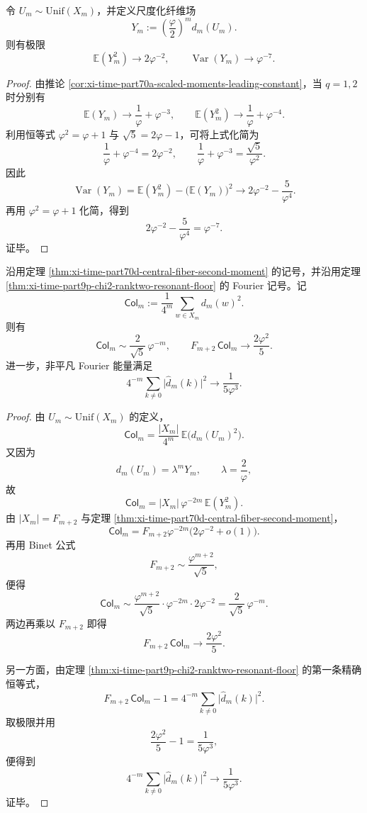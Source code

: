 \begin{theorem}[中心纤维场的精确二阶常数]\label{thm:xi-time-part70d-central-fiber-second-moment}
令 \(U_m\sim \mathrm{Unif}(X_m)\)，并定义尺度化纤维场
\[
Y_m:=\left(\frac{\varphi}{2}\right)^m d_m(U_m).
\]
则有极限
\[
\mathbb E(Y_m^2)\longrightarrow 2\varphi^{-2},
\qquad
\operatorname{Var}(Y_m)\longrightarrow \varphi^{-7}.
\]
\end{theorem}
\begin{proof}
由推论 \ref{cor:xi-time-part70a-scaled-moments-leading-constant}，当 \(q=1,2\) 时分别有
\[
\mathbb E(Y_m)
\longrightarrow
\frac{1}{\varphi}+\varphi^{-3},
\qquad
\mathbb E(Y_m^2)
\longrightarrow
\frac{1}{\varphi}+\varphi^{-4}.
\]
利用恒等式 \(\varphi^2=\varphi+1\) 与 \(\sqrt5=2\varphi-1\)，可将上式化简为
\[
\frac{1}{\varphi}+\varphi^{-4}=2\varphi^{-2},
\qquad
\frac{1}{\varphi}+\varphi^{-3}=\frac{\sqrt5}{\varphi^2}.
\]
因此
\[
\operatorname{Var}(Y_m)
=
\mathbb E(Y_m^2)-\bigl(\mathbb E(Y_m)\bigr)^2
\longrightarrow
2\varphi^{-2}-\frac{5}{\varphi^4}.
\]
再用 \(\varphi^2=\varphi+1\) 化简，得到
\[
2\varphi^{-2}-\frac{5}{\varphi^4}=\varphi^{-7}.
\]
证毕。
\end{proof}

\begin{theorem}\label{thm:xi-time-part70d-collision-riesz-main-terms}
沿用定理 \ref{thm:xi-time-part70d-central-fiber-second-moment} 的记号，并沿用定理 \ref{thm:xi-time-part9p-chi2-ranktwo-resonant-floor} 的 Fourier 记号。记
\[
\mathsf{Col}_m:=
\frac{1}{4^m}\sum_{w\in X_m}d_m(w)^2.
\]
则有
\[
\mathsf{Col}_m\sim \frac{2}{\sqrt5}\,\varphi^{-m},
\qquad
F_{m+2}\,\mathsf{Col}_m\longrightarrow \frac{2\varphi^2}{5}.
\]
进一步，非平凡 Fourier 能量满足
\[
4^{-m}\sum_{k\ne 0}\bigl|\widehat d_m(k)\bigr|^2
\longrightarrow
\frac{1}{5\varphi^3}.
\]
\end{theorem}
\begin{proof}
由 \(U_m\sim\mathrm{Unif}(X_m)\) 的定义，
\[
\mathsf{Col}_m
=
\frac{|X_m|}{4^m}\,\mathbb E\!\bigl(d_m(U_m)^2\bigr).
\]
又因为
\[
d_m(U_m)=\lambda^m Y_m,
\qquad
\lambda=\frac{2}{\varphi},
\]
故
\[
\mathsf{Col}_m
=
|X_m|\,\varphi^{-2m}\,\mathbb E(Y_m^2).
\]
由 \(|X_m|=F_{m+2}\) 与定理 \ref{thm:xi-time-part70d-central-fiber-second-moment}，
\[
\mathsf{Col}_m
=
F_{m+2}\varphi^{-2m}\bigl(2\varphi^{-2}+o(1)\bigr).
\]
再用 Binet 公式
\[
F_{m+2}\sim \frac{\varphi^{m+2}}{\sqrt5},
\]
便得
\[
\mathsf{Col}_m
\sim
\frac{\varphi^{m+2}}{\sqrt5}\cdot \varphi^{-2m}\cdot 2\varphi^{-2}
=
\frac{2}{\sqrt5}\,\varphi^{-m}.
\]
两边再乘以 \(F_{m+2}\) 即得
\[
F_{m+2}\,\mathsf{Col}_m\longrightarrow \frac{2\varphi^2}{5}.
\]

另一方面，由定理 \ref{thm:xi-time-part9p-chi2-ranktwo-resonant-floor} 的第一条精确恒等式，
\[
F_{m+2}\,\mathsf{Col}_m-1
=
4^{-m}\sum_{k\ne 0}\bigl|\widehat d_m(k)\bigr|^2.
\]
取极限并用
\[
\frac{2\varphi^2}{5}-1=\frac{1}{5\varphi^3},
\]
便得到
\[
4^{-m}\sum_{k\ne 0}\bigl|\widehat d_m(k)\bigr|^2
\longrightarrow
\frac{1}{5\varphi^3}.
\]
证毕。
\end{proof}

